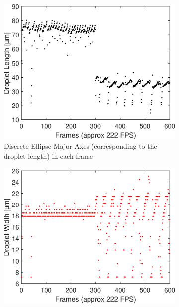                         \vspace{1cm}
	\begin{figure}[h]
	\begin{subfigure}[l]{0.49\textwidth} 
		\centering
		\includegraphics[clip,trim={0mm 0mm 0mm 0mm}, scale=.5]{Ressourcen/Tracking/Length}
		\caption{Discrete Ellipse Major Axes (corresponding to the droplet length) in each frame}
		\label{fig:tracking:length}
	\end{subfigure}
	\hfil
	\begin{subfigure}[r]{0.49\textwidth} 
		\centering
		\includegraphics[clip,trim={0mm 0mm 0mm 0mm},scale=.5]{Ressourcen/Tracking/Width}

\end{subfigure}
\end{figure}
